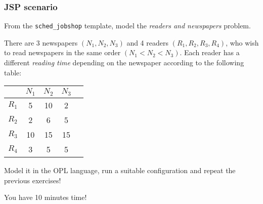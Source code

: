\begin{frame} \frametitle{JSP scenario}
\pause
From the \texttt{sched\_jobshop} template, model the \emph{readers and newspapers} problem.

\pause \medskip

There are 3 newspapers $(N_1, N_2, N_3)$ and 4 readers $(R_1, R_2, R_3, R_4)$, who wish to read newspapers in the same order $(N_1 < N_2 < N_3)$. Each reader has a different \emph{reading time} depending on the newspaper according to the following table:

\pause \medskip

\begin{table}
\centering
\begin{tabular}{|l|c|c|c|c|}
\hline
		& $N_1$	& $N_2$	& $N_3$	\\ \hline
$R_1$	& 5		& 10	& 2		\\ \hline
$R_2$	& 2		& 6		& 5		\\ \hline
$R_3$	& 10	& 15	& 15	\\ \hline
$R_4$	& 3		& 5		& 5		\\ \hline
\end{tabular}

\end{table}

\pause

\begin{center}
Model it in the OPL language, run a suitable configuration and repeat the previous exercises!
\end{center}

\begin{center}
You have 10 minutes time! 
\end{center}


\end{frame}


